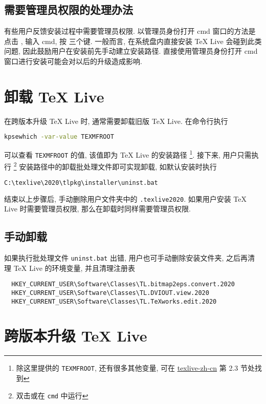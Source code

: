 \subsection{需要管理员权限的处理办法}

有些用户反馈安装过程中需要管理员权限.
以管理员身份打开 \textsf{cmd} 窗口的方法是点击 \keys{\faWindows},
输入 \textsf{cmd},
按 \keys{\ctrl + \shift + \enter} 三个键.
一般而言,
在系统盘内直接安装 \TeX{} Live 会碰到此类问题,
因此鼓励用户在安装前先手动建立安装路径.
直接使用管理员身份打开 \textsf{cmd} 窗口进行安装可能会对以后的升级造成影响.

\section{卸载 \TeX{} Live}

在跨版本升级 \TeX{} Live 时, 通常需要卸载旧版 \TeX{} Live.
在命令行执行
\begin{lstlisting}[language=bash]
  kpsewhich -var-value TEXMFROOT
\end{lstlisting}
可以查看 \texttt{TEXMFROOT} 的值,
该值即为 \TeX{} Live 的安装路径%
\footnote{%
  除这里提供的 \texttt{TEXMFROOT}, 还有很多其他变量, 可在
  \href{https://www.tug.org/texlive/doc/texlive-zh-cn/texlive-zh-cn.pdf}{texlive-zh-cn}
  第 2.3 节处找到
}. 
接下来,
用户只需执行%
\footnote{双击或在 \texttt{cmd} 中运行}%
安装路径中的卸载批处理文件即可实现卸载, 如默认安装时执行
\begin{lstlisting}[language=bash]
  C:\texlive\2020\tlpkg\installer\uninst.bat
\end{lstlisting}
结束以上步骤后,
手动删除用户文件夹中的 \texttt{.texlive2020}.
如果用户安装 \TeX{} Live 时需要管理员权限,
那么在卸载时同样需要管理员权限.

\subsection{手动卸载}

如果执行批处理文件 \texttt{uninst.bat} 出错,
用户也可手动删除安装文件夹,
之后再清理 \TeX{} Live 的环境变量,
并且清理注册表
\begin{lstlisting}
  HKEY_CURRENT_USER\Software\Classes\TL.bitmap2eps.convert.2020
  HKEY_CURRENT_USER\Software\Classes\TL.DVIOUT.view.2020
  HKEY_CURRENT_USER\Software\Classes\TL.TeXworks.edit.2020
\end{lstlisting}


\section{跨版本升级 \TeX{} Live}

